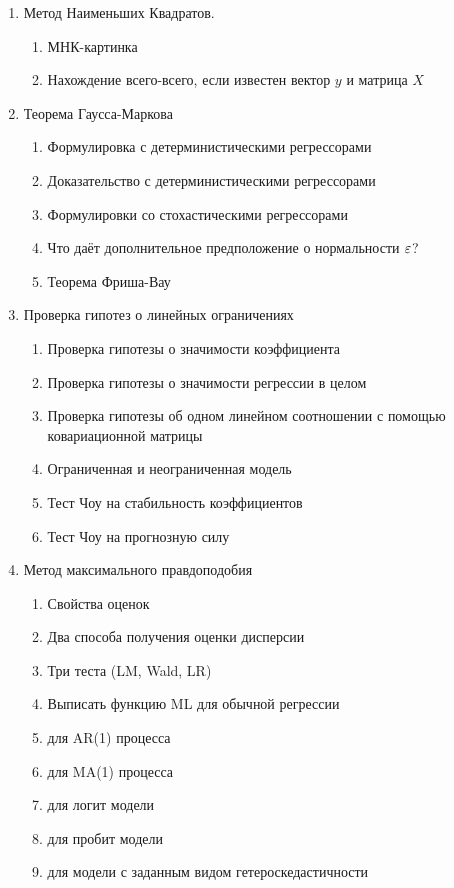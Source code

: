 \documentclass[12pt, a4paper]{article}
\theoremstyle{definition}
\begin{document}
\begin{enumerate}

\item Метод Наименьших Квадратов.

\begin{enumerate}
\item МНК-картинка
\item Нахождение всего-всего, если известен вектор $y$ и матрица $X$
  \end{enumerate}

\item Теорема Гаусса-Маркова
\begin{enumerate}
\item Формулировка с детерминистическими регрессорами
\item Доказательство с детерминистическими регрессорами
\item Формулировки со стохастическими регрессорами
\item Что даёт дополнительное предположение о нормальности $\varepsilon$?
\item Теорема Фриша-Вау
\end{enumerate}

\item Проверка гипотез о линейных ограничениях
\begin{enumerate}
\item Проверка гипотезы о значимости коэффициента
\item Проверка гипотезы о значимости регрессии в целом
\item Проверка гипотезы об одном линейном соотношении с помощью ковариационной матрицы
\item Ограниченная и неограниченная модель
\item Тест Чоу на стабильность коэффициентов
\item Тест Чоу на прогнозную силу
\end{enumerate}

\item Метод максимального правдоподобия

\begin{enumerate}
\item Свойства оценок
\item Два способа получения оценки дисперсии
\item Три теста (LM, Wald, LR)
\item Выписать функцию ML для обычной регрессии
\item для AR(1) процесса
\item для MA(1) процесса
\item для логит модели
\item для пробит модели
\item для модели с заданным видом гетероскедастичности
\end{enumerate}


\end{enumerate}
\end{document}
